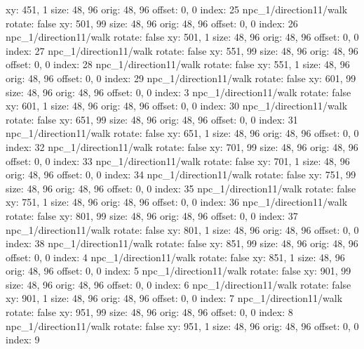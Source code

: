   xy: 451, 1
  size: 48, 96
  orig: 48, 96
  offset: 0, 0
  index: 25
npc_1/direction11/walk
  rotate: false
  xy: 501, 99
  size: 48, 96
  orig: 48, 96
  offset: 0, 0
  index: 26
npc_1/direction11/walk
  rotate: false
  xy: 501, 1
  size: 48, 96
  orig: 48, 96
  offset: 0, 0
  index: 27
npc_1/direction11/walk
  rotate: false
  xy: 551, 99
  size: 48, 96
  orig: 48, 96
  offset: 0, 0
  index: 28
npc_1/direction11/walk
  rotate: false
  xy: 551, 1
  size: 48, 96
  orig: 48, 96
  offset: 0, 0
  index: 29
npc_1/direction11/walk
  rotate: false
  xy: 601, 99
  size: 48, 96
  orig: 48, 96
  offset: 0, 0
  index: 3
npc_1/direction11/walk
  rotate: false
  xy: 601, 1
  size: 48, 96
  orig: 48, 96
  offset: 0, 0
  index: 30
npc_1/direction11/walk
  rotate: false
  xy: 651, 99
  size: 48, 96
  orig: 48, 96
  offset: 0, 0
  index: 31
npc_1/direction11/walk
  rotate: false
  xy: 651, 1
  size: 48, 96
  orig: 48, 96
  offset: 0, 0
  index: 32
npc_1/direction11/walk
  rotate: false
  xy: 701, 99
  size: 48, 96
  orig: 48, 96
  offset: 0, 0
  index: 33
npc_1/direction11/walk
  rotate: false
  xy: 701, 1
  size: 48, 96
  orig: 48, 96
  offset: 0, 0
  index: 34
npc_1/direction11/walk
  rotate: false
  xy: 751, 99
  size: 48, 96
  orig: 48, 96
  offset: 0, 0
  index: 35
npc_1/direction11/walk
  rotate: false
  xy: 751, 1
  size: 48, 96
  orig: 48, 96
  offset: 0, 0
  index: 36
npc_1/direction11/walk
  rotate: false
  xy: 801, 99
  size: 48, 96
  orig: 48, 96
  offset: 0, 0
  index: 37
npc_1/direction11/walk
  rotate: false
  xy: 801, 1
  size: 48, 96
  orig: 48, 96
  offset: 0, 0
  index: 38
npc_1/direction11/walk
  rotate: false
  xy: 851, 99
  size: 48, 96
  orig: 48, 96
  offset: 0, 0
  index: 4
npc_1/direction11/walk
  rotate: false
  xy: 851, 1
  size: 48, 96
  orig: 48, 96
  offset: 0, 0
  index: 5
npc_1/direction11/walk
  rotate: false
  xy: 901, 99
  size: 48, 96
  orig: 48, 96
  offset: 0, 0
  index: 6
npc_1/direction11/walk
  rotate: false
  xy: 901, 1
  size: 48, 96
  orig: 48, 96
  offset: 0, 0
  index: 7
npc_1/direction11/walk
  rotate: false
  xy: 951, 99
  size: 48, 96
  orig: 48, 96
  offset: 0, 0
  index: 8
npc_1/direction11/walk
  rotate: false
  xy: 951, 1
  size: 48, 96
  orig: 48, 96
  offset: 0, 0
  index: 9

